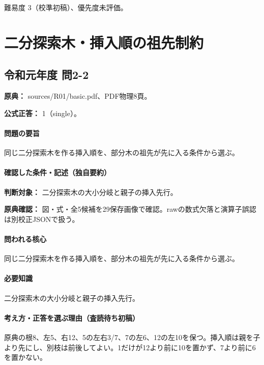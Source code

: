 \par 難易度 3（校準初稿）、優先度未評価。

\section{二分探索木・挿入順の祖先制約}

\subsection{令和元年度 問2-2}
\label{q:r01-reg-basic-2-2}

\noindent\textbf{原典：} sources/R01/basic.pdf、PDF物理8頁。

\textbf{公式正答：} 1（single）。

\paragraph{問題の要旨} 同じ二分探索木を作る挿入順を、部分木の祖先が先に入る条件から選ぶ。

\paragraph{確認した条件・記述（独自要約）}\mbox{}\par

\noindent\textbf{判断対象：} 二分探索木の大小分岐と親子の挿入先行。\par

\noindent\textbf{原典確認：} 図・式・全5候補を29保存画像で確認。rawの数式欠落と演算子誤認は別校正JSONで扱う。\par

\paragraph{問われる核心} 同じ二分探索木を作る挿入順を、部分木の祖先が先に入る条件から選ぶ。

\paragraph{必要知識} 二分探索木の大小分岐と親子の挿入先行。

\paragraph{考え方・正答を選ぶ理由（査読待ち初稿）} 原典の根8、左5、右12、5の左右3/7、7の左6、12の左10を保つ。挿入順は親を子より先にし、別枝は前後してよい。1だけが12より前に10を置かず、7より前に6を置かない。

